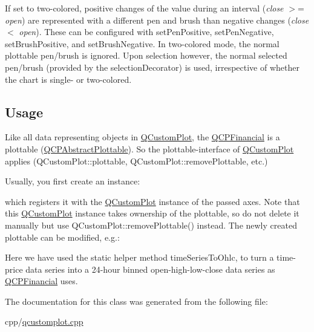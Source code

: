 If set to two-\/colored, positive changes of the value during an interval ({\itshape close} $>$= {\itshape open}) are represented with a different pen and brush than negative changes ({\itshape close} $<$ {\itshape open}). These can be configured with set\+Pen\+Positive, set\+Pen\+Negative, set\+Brush\+Positive, and set\+Brush\+Negative. In two-\/colored mode, the normal plottable pen/brush is ignored. Upon selection however, the normal selected pen/brush (provided by the selection\+Decorator) is used, irrespective of whether the chart is single-\/ or two-\/colored.\hypertarget{class_q_c_p_financial_qcpfinancial-usage}{}\subsection{Usage}\label{class_q_c_p_financial_qcpfinancial-usage}
Like all data representing objects in \mbox{\hyperlink{class_q_custom_plot}{Q\+Custom\+Plot}}, the \mbox{\hyperlink{class_q_c_p_financial}{Q\+C\+P\+Financial}} is a plottable (\mbox{\hyperlink{class_q_c_p_abstract_plottable}{Q\+C\+P\+Abstract\+Plottable}}). So the plottable-\/interface of \mbox{\hyperlink{class_q_custom_plot}{Q\+Custom\+Plot}} applies (Q\+Custom\+Plot\+::plottable, Q\+Custom\+Plot\+::remove\+Plottable, etc.)

Usually, you first create an instance\+:


\begin{DoxyCodeInclude}
\end{DoxyCodeInclude}
which registers it with the \mbox{\hyperlink{class_q_custom_plot}{Q\+Custom\+Plot}} instance of the passed axes. Note that this \mbox{\hyperlink{class_q_custom_plot}{Q\+Custom\+Plot}} instance takes ownership of the plottable, so do not delete it manually but use Q\+Custom\+Plot\+::remove\+Plottable() instead. The newly created plottable can be modified, e.\+g.\+:


\begin{DoxyCodeInclude}
\end{DoxyCodeInclude}
Here we have used the static helper method time\+Series\+To\+Ohlc, to turn a time-\/price data series into a 24-\/hour binned open-\/high-\/low-\/close data series as \mbox{\hyperlink{class_q_c_p_financial}{Q\+C\+P\+Financial}} uses. 

The documentation for this class was generated from the following file\+:\begin{DoxyCompactItemize}
\item 
cpp/\mbox{\hyperlink{qcustomplot_8cpp}{qcustomplot.\+cpp}}\end{DoxyCompactItemize}
